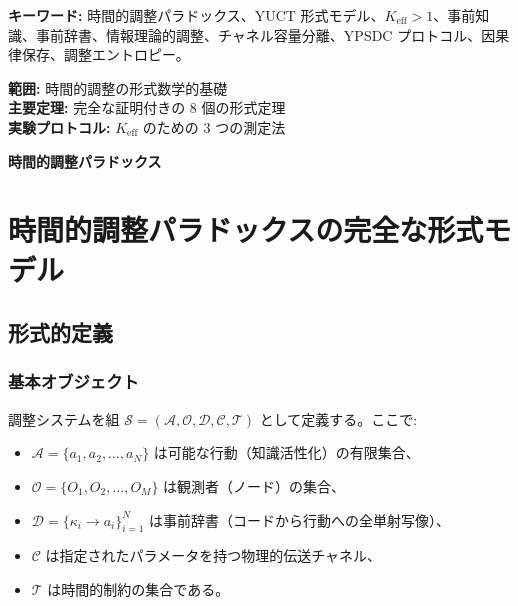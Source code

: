 \documentclass[12pt,a4paper]{ltjsarticle}
\begin{document}
\begin{titlepage}
\begin{center}
			\vspace{0.5cm}
			\normalsize
			\textbf{キーワード:} 時間的調整パラドックス、YUCT 形式モデル、$K_{\text{eff}} > 1$、事前知識、事前辞書、情報理論的調整、チャネル容量分離、YPSDC プロトコル、因果律保存、調整エントロピー。
			
			\vspace{0cm}
			\normalsize
			
			\textbf{範囲:} 時間的調整の形式数学的基礎 \\
			\textbf{主要定理:} 完全な証明付きの 8 個の形式定理 \\
			\textbf{実験プロトコル:} $K_{\text{eff}}$ のための 3 つの測定法 \\
			
			\vspace{0.5cm}
			\normalsize
			
		\end{center}
	\end{titlepage}
	
	\begin{center}
		\vspace*{0.5cm}
		\Huge\textbf{時間的調整パラドックス}
		\vspace{1cm}
	\end{center}
	
	\section{時間的調整パラドックスの完全な形式モデル}
	\label{app:formal-model}
	
	\subsection{形式的定義}
	\label{app:definitions}
	
	\subsubsection{基本オブジェクト}
	
	調整システムを組 $\mathcal{S} = (\mathcal{A}, \mathcal{O}, \mathcal{D}, \mathcal{C}, \mathcal{T})$ として定義する。ここで:
	
	\begin{itemize}
		\item $\mathcal{A} = \{a_1, a_2, \dots, a_N\}$ は可能な行動（知識活性化）の有限集合、
		\item $\mathcal{O} = \{O_1, O_2, \dots, O_M\}$ は観測者（ノード）の集合、
		\item $\mathcal{D} = \{\kappa_i \to a_i\}_{i=1}^N$ は事前辞書（コードから行動への全単射写像）、
		\item $\mathcal{C}$ は指定されたパラメータを持つ物理的伝送チャネル、
		\item $\mathcal{T}$ は時間的制約の集合である。
	\end{itemize}
	
\end{document}
